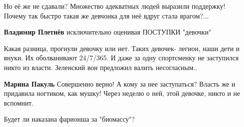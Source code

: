 \begin{itemize}
Но её же не сдавали? Множество адекватных людей выразили поддержку! Почему так
быстро такая же девчонка для неё вдруг стала врагом?...

\begin{itemize}
 
\textbf{Владимир Плетнёв} исключительно оценивая ПОСТУПКИ "девочки"
\end{itemize}

 

Какая разница, прогнули девочку или нет. Таких девочек- легион, наши дети и
внуки. Их оболванивают 24/7/365. И даже за одну спортсменку не заступился никто
из власти. Зеленский вон предложил валить несогласным..

\begin{itemize}
 
\textbf{Марина Пакуль}
Совершенно верно! А кому за нее заступаться? Власть же и придавила ногтиком, как мушку! Через неделю о ней, этой девочке, никто и не вспомнит.
\end{itemize}

 
Будет ли наказана фарионша за "биомассу"?

\begin{itemize}
 

\end{itemize}
\end{itemize}
